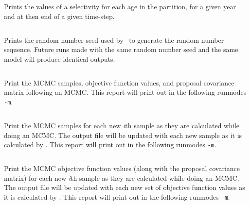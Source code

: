Prints the values of a selectivity for each age in the partition, for a given year and at then end of a given time-step.

\subsection{}

Prints the random number seed used by \CNAME\ to generate the random number sequence. Future runs made with the same random number seed and the same model will produce identical outputs.

\subsection{}

Print the MCMC samples, objective function values, and proposal covariance matrix following an MCMC. This report will print out in the following runmodes \texttt{-m}.

\subsection{}

Print the MCMC samples for each new \textit{i}th sample as they are calculated while doing an MCMC. The output file will be updated with each new sample as it is calculated by \CNAME. This report will print out in the following runmodes \texttt{-m}.

\subsection{}

Print the MCMC objective function values (along with the proposal covariance matrix) for each new \textit{i}th sample as they are calculated while doing an MCMC. The output file will be updated with each new set of objective function values as it is calculated by \CNAME. This report will print out in the following runmodes \texttt{-m}.

